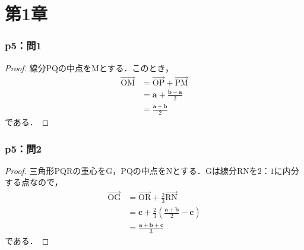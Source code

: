 \documentclass[a4paper,10pt,fleqn]{ltjsarticle}
\begin{document}
\newpage
\part*{第1章}

\section*{p5：問1}

\begin{tleftbar}
    \begin{proof}
        線分$\mathrm{PQ}$の中点を$\mathrm{M}$とする．このとき，
        \begin{align*}
            \overrightarrow{\mathrm{OM}} & = \overrightarrow{\mathrm{OP}} + \overrightarrow{\mathrm{PM}} \\
                                         & = \bm{a} + \frac{\bm{b}-\bm{a}}{2}                            \\
                                         & = \frac{\bm{a}+\bm{b}}{2}
        \end{align*}
        である．
    \end{proof}
\end{tleftbar}
\section*{p5：問2}
\begin{tleftbar}
    \begin{proof}
        三角形$\mathrm{PQR}$の重心を$\mathrm{G}$，$\mathrm{PQ}$の中点を$\mathrm{N}$とする．$\mathrm{G}$は線分$\mathrm{RN}$を$2：1$に内分する点なので，
        \begin{align*}
            \overrightarrow{\mathrm{OG}} & = \overrightarrow{\mathrm{OR}} + \frac{2}{3} \overrightarrow{\mathrm{RN}} \\
                                         & = \bm{c}+ \frac{2}{3} \left (\frac{\bm{a}+\bm{b}}{2}-\bm{c} \right)       \\
                                         & = \frac{\bm{a}+\bm{b}+\bm{c}}{3}
        \end{align*}
        である．
    \end{proof}
\end{tleftbar}

\newpage
\end{document}
